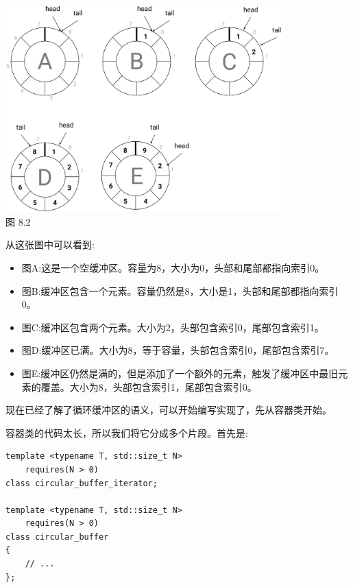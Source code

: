 \begin{center}
\includegraphics[width=0.8\textwidth]{content/3/chapter8/images/2.png}\\
图 8.2
\end{center}

从这张图中可以看到:

\begin{itemize}
\item
图A:这是一个空缓冲区。容量为8，大小为0，头部和尾部都指向索引0。

\item
图B:缓冲区包含一个元素。容量仍然是8，大小是1，头部和尾部都指向索引0。

\item
图C:缓冲区包含两个元素。大小为2，头部包含索引0，尾部包含索引1。

\item
图D:缓冲区已满。大小为8，等于容量，头部包含索引0，尾部包含索引7。

\item
图E:缓冲区仍然是满的，但是添加了一个额外的元素，触发了缓冲区中最旧元素的覆盖。大小为8，头部包含索引1，尾部包含索引0。
\end{itemize}

现在已经了解了循环缓冲区的语义，可以开始编写实现了，先从容器类开始。


容器类的代码太长，所以我们将它分成多个片段。首先是:

\begin{lstlisting}[style=styleCXX]
template <typename T, std::size_t N>
	requires(N > 0)
class circular_buffer_iterator;

template <typename T, std::size_t N>
	requires(N > 0)
class circular_buffer
{
	// ...
};
\end{lstlisting}

